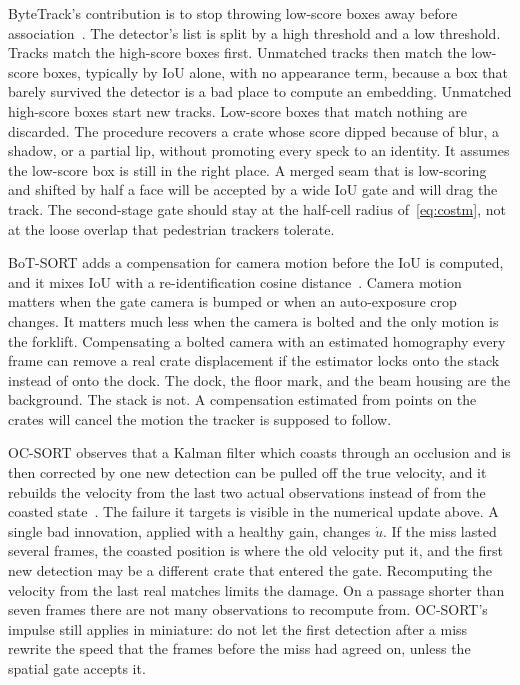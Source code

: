 \documentclass[11pt,a4paper]{article}
\begin{document}
ByteTrack's contribution is to stop throwing low-score boxes away before association~\cite{zhang2022bytetrack}. The detector's list is split by a high threshold and a low threshold. Tracks match the high-score boxes first. Unmatched tracks then match the low-score boxes, typically by IoU alone, with no appearance term, because a box that barely survived the detector is a bad place to compute an embedding. Unmatched high-score boxes start new tracks. Low-score boxes that match nothing are discarded. The procedure recovers a crate whose score dipped because of blur, a shadow, or a partial lip, without promoting every speck to an identity. It assumes the low-score box is still in the right place. A merged seam that is low-scoring and shifted by half a face will be accepted by a wide IoU gate and will drag the track. The second-stage gate should stay at the half-cell radius of~\eqref{eq:costm}, not at the loose overlap that pedestrian trackers tolerate.

BoT-SORT adds a compensation for camera motion before the IoU is computed, and it mixes IoU with a re-identification cosine distance~\cite{aharon2022botsort}. Camera motion matters when the gate camera is bumped or when an auto-exposure crop changes. It matters much less when the camera is bolted and the only motion is the forklift. Compensating a bolted camera with an estimated homography every frame can remove a real crate displacement if the estimator locks onto the stack instead of onto the dock. The dock, the floor mark, and the beam housing are the background. The stack is not. A compensation estimated from points on the crates will cancel the motion the tracker is supposed to follow.

OC-SORT observes that a Kalman filter which coasts through an occlusion and is then corrected by one new detection can be pulled off the true velocity, and it rebuilds the velocity from the last two actual observations instead of from the coasted state~\cite{cao2023ocsort}. The failure it targets is visible in the numerical update above. A single bad innovation, applied with a healthy gain, changes $\dot u$. If the miss lasted several frames, the coasted position is where the old velocity put it, and the first new detection may be a different crate that entered the gate. Recomputing the velocity from the last real matches limits the damage. On a passage shorter than seven frames there are not many observations to recompute from. OC-SORT's impulse still applies in miniature: do not let the first detection after a miss rewrite the speed that the frames before the miss had agreed on, unless the spatial gate accepts it.
\end{document}
